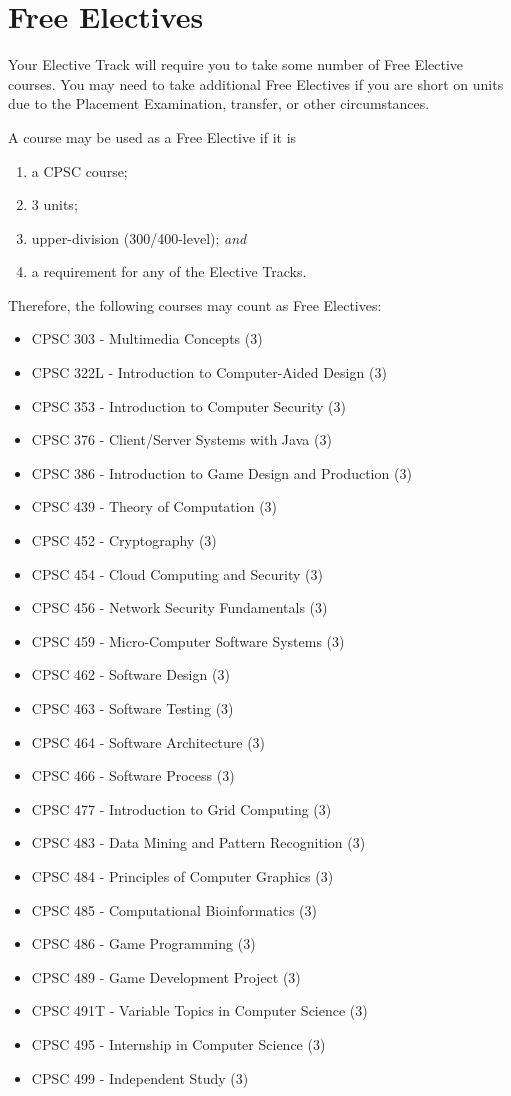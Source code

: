 \documentclass{book}
\begin{document}
\section{Free Electives}
\label{section:free_electives}

Your Elective Track will require you to take some number of Free Elective courses. You may need to take additional Free Electives if you are short on units due to the Placement Examination, transfer, or other circumstances.

A course may be used as a Free Elective if it is
\begin{enumerate}
\item a CPSC course;
\item 3 units;
\item upper-division (300/400-level); \emph{and}
\item a requirement for any of the Elective Tracks.
\end{enumerate}

Therefore, the following courses may count as Free Electives:
\begin{itemize}
\item CPSC 303 - Multimedia Concepts (3)
\item CPSC 322L - Introduction to Computer-Aided Design (3)
\item CPSC 353 - Introduction to Computer Security (3)
\item CPSC 376 - Client/Server Systems with Java (3)
\item CPSC 386 - Introduction to Game Design and Production (3)
\item CPSC 439 - Theory of Computation (3)
\item CPSC 452 - Cryptography (3)
\item CPSC 454 - Cloud Computing and Security (3)
\item CPSC 456 - Network Security Fundamentals (3)
\item CPSC 459 - Micro-Computer Software Systems (3)
\item CPSC 462 - Software Design (3)
\item CPSC 463 - Software Testing (3)
\item CPSC 464 - Software Architecture (3)
\item CPSC 466 - Software Process (3)
\item CPSC 477 - Introduction to Grid Computing (3)
\item CPSC 483 - Data Mining and Pattern Recognition (3)
\item CPSC 484 - Principles of Computer Graphics (3)
\item CPSC 485 - Computational Bioinformatics (3)
\item CPSC 486 - Game Programming (3)
\item CPSC 489 - Game Development Project (3)
\item CPSC 491T - Variable Topics in Computer Science (3)
\item CPSC 495 - Internship in Computer Science (3)
\item CPSC 499 - Independent Study (3)
\end{itemize}
\end{document}
